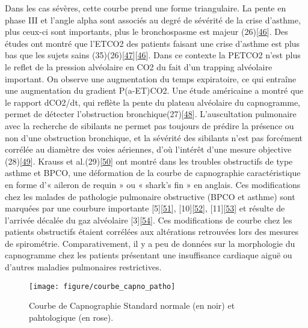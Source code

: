 \documentclass[12pt,]{article}
\begin{document}
Dans les cas sévères, cette courbe prend une forme triangulaire. La
pente en phase III et l'angle alpha sont associés au degré de sévérité
de la crise d'asthme, plus ceux-ci sont importants, plus le
bronchospasme est majeur
(26){[}\protect\hyperlink{ref-langhan2008quantitative}{46}{]}. Des
études ont montré que l'ETCO2 des patients faisant une crise d'asthme
est plus bas que les sujets sains
(35)(26){[}\protect\hyperlink{ref-den2006bayesian}{47}{]}{[}\protect\hyperlink{ref-langhan2008quantitative}{46}{]}.
Dans ce contexte la PETCO2 n'est plus le reflet de la pression
alvéolaire en CO2 du fait d'un trapping alvéolaire important. On observe
une augmentation du temps expiratoire, ce qui entraîne une augmentation
du gradient P(a-ET)CO2. Une étude américaine a montré que le rapport
dCO2/dt, qui reflète la pente du plateau alvéolaire du capnogramme,
permet de détecter l'obstruction
bronchique(27){[}\protect\hyperlink{ref-yaron1996utility}{48}{]}.
L'auscultation pulmonaire avec la recherche de sibilants ne permet pas
toujours de prédire la présence ou non d'une obstruction bronchique, et
la sévérité des sibilants n'est pas forcément corrélée au diamètre des
voies aériennes, d'où l'intérêt d'une mesure objective
(28){[}\protect\hyperlink{ref-egleston1997capnography}{49}{]}. Krauss et
al.(29){[}\protect\hyperlink{ref-krauss2005capnogram}{50}{]} ont montré
dans les troubles obstructifs de type asthme et BPCO, une déformation de
la courbe de capnographie caractéristique en forme d'« aileron de requin
» ou « shark's fin » en anglais. Ces modifications chez les malades de
pathologie pulmonaire obstructive (BPCO et asthme) sont marquées par une
courbure importante
{[}5{]}{[}\protect\hyperlink{ref-you1994expiratory}{51}{]},
{[}10{]}{[}\protect\hyperlink{ref-smalhout1975atlas}{52}{]},
{[}11{]}{[}\protect\hyperlink{ref-kelsey1962expiratory}{53}{]} et
résulte de l'arrivée décalée du gaz alvéolaire
{[}3{]}{[}\protect\hyperlink{ref-dubois1952alveolar}{54}{]}. Ces
modifications de courbe chez les patients obstructifs étaient corrélées
aux altérations retrouvées lors des mesures de spirométrie.
Comparativement, il y a peu de données sur la morphologie du capnogramme
chez les patients présentant une insuffisance cardiaque aiguë ou
d'autres maladies pulmonaires restrictives.

\begin{figure}[h!]

{\centering \texttt{[image: figure/courbe\_capno\_patho]} 

}

\caption{Courbe de Capnographie Standard normale (en noir) et pahtologique (en rose).}\label{fig:unnamed-chunk-6}
\end{figure}
\end{document}
